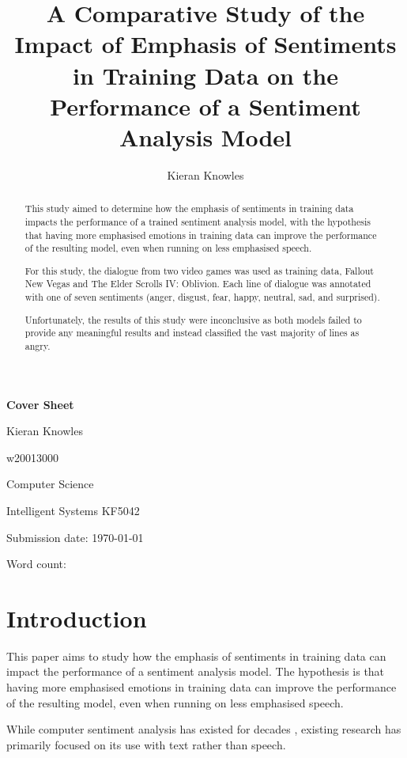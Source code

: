 \documentclass[journal]{IEEEtran}
\newcommand\wordcount{
    
}
\begin{document}
{\Large \textbf{Cover Sheet}}

Kieran Knowles

w20013000

Computer Science

Intelligent Systems KF5042

Submission date: \today

Word count: \wordcount

\title{A Comparative Study of the Impact of Emphasis of Sentiments in Training Data on the Performance of a Sentiment Analysis Model}
\author{Kieran Knowles}
\maketitle


\begin{abstract}
    This study aimed to determine how the emphasis of sentiments in training data impacts the
    performance of a trained sentiment analysis model, with the hypothesis that having more emphasised
    emotions in training data can improve the performance of the resulting model, even when running
    on less emphasised speech.

    For this study, the dialogue from two video games was used as training data, Fallout New Vegas and
    The Elder Scrolls IV: Oblivion. Each line of dialogue was annotated with one of seven sentiments
    (anger, disgust, fear, happy, neutral, sad, and surprised).

    Unfortunately, the results of this study were inconclusive as both models failed to provide any
    meaningful results and instead classified the vast majority of lines as angry.
\end{abstract}

\section{Introduction}
This paper aims to study how the emphasis of sentiments in training data can impact the performance of a sentiment analysis
model. The hypothesis is that having more emphasised emotions in training data can improve the performance of the resulting
model, even when running on less emphasised speech.

While computer sentiment analysis has existed for decades \cite{stone_computer_1963}, existing research has primarily focused on
its use with text rather than speech. \cite{maghilnan_sentiment_2017}
\end{document}
